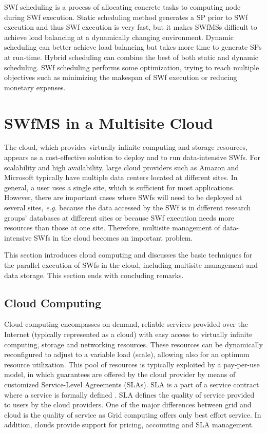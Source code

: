 SWf scheduling is a process of allocating concrete tasks to computing
node during SWf execution.
Static scheduling method generates a SP prior to SWf execution and thus SWf execution is very fast,
but it makes SWfMSs difficult to achieve load balancing at a dynamically changing environment.
Dynamic scheduling can better achieve load balancing but takes more
time to generate SPs at run-time.  Hybrid scheduling
can combine the best of both static and dynamic scheduling.
SWf scheduling performs some optimization, trying to reach multiple objectives such as minimizing
the makespan of SWf execution or reducing monetary expenses.


\section{SWfMS in a Multisite Cloud}
\label{sec:SOASMC}

The cloud, which provides virtually infinite computing and storage
resources, appears as a cost-effective solution to deploy and to run data-intensive SWfs.
For scalability and high availability, large cloud providers such as Amazon and Microsoft typically have
multiple data centers located at different sites. In general, a user uses a single site, which is sufficient for most applications.
However, there are important cases where SWfs will
need to be deployed at several sites, \textit{e.g.} because the data accessed by
the SWf is in different research groups' databases at different
sites or because SWf execution needs more resources than those at one site.
Therefore, multisite management of data-intensive SWfs
in the cloud becomes an important problem.

This section introduces cloud computing and discusses the basic techniques for the parallel
execution of SWfs in the cloud, including multisite management and data storage. 
This section ends with concluding remarks.


\subsection{Cloud Computing}

Cloud computing encompasses on demand, reliable services provided over
the Internet (typically represented as a cloud) with easy access to
virtually infinite computing, storage and networking resources.
These resources can be dynamically reconfigured to adjust
to a variable load (scale), allowing also for an optimum resource
utilization. This pool of resources is typically exploited by a pay-per-use
model, in which guarantees are offered by the cloud provider
by means of customized Service-Level Agreements (SLAs).
SLA is a part of a service contract where a service
is formally defined \cite{Wieder2011}. SLA defines the quality of
service provided to users by the cloud providers. One of the major
differences between grid and cloud is the quality of service as Grid
computing offers only best effort service.
In addition, clouds provide support for pricing, accounting and SLA
management.

